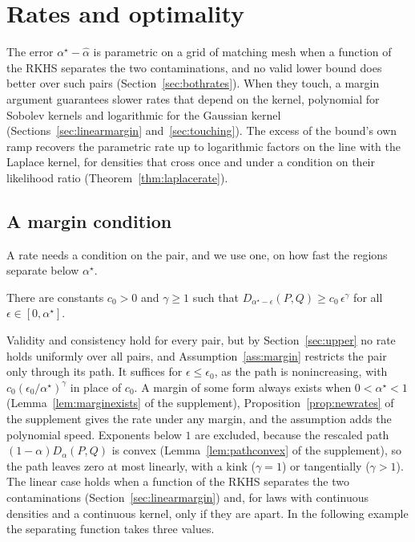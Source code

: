 \section{Rates and optimality}
\label{sec:rates}

The error $\alpha^\star-\widehat\alpha$ is parametric on a grid of matching mesh when a function of the RKHS
separates the two contaminations, and no valid lower bound does better over such pairs (Section~\ref{sec:bothrates}). When they touch, a margin argument guarantees slower rates that depend on
the kernel, polynomial for Sobolev kernels and logarithmic for the Gaussian kernel (Sections~\ref{sec:linearmargin}
and~\ref{sec:touching}). The excess of the bound's own ramp recovers the parametric rate up to logarithmic factors on
the line with the Laplace kernel, for densities that cross once and under a condition on their likelihood ratio
(Theorem~\ref{thm:laplacerate}).

\subsection{A margin condition}
\label{sec:rate}

A rate needs a condition on the pair, and we use one, on how fast the regions separate below $\alpha^\star$.

\begin{assumption}
\label{ass:margin}
There are constants $c_0>0$ and $\gamma\ge1$ such that $D_{\alpha^\star-\epsilon}(P,Q)\ge c_0\,\epsilon^\gamma$ for
all $\epsilon\in[0,\alpha^\star]$.
\end{assumption}

Validity and consistency hold for every pair, but by Section~\ref{sec:upper} no rate holds uniformly over all pairs,
and Assumption~\ref{ass:margin} restricts the pair only through its path. It suffices for $\epsilon\le\epsilon_0$, as the path is
nonincreasing, with $c_0(\epsilon_0/\alpha^\star)^\gamma$ in place of $c_0$. A margin of some form always exists when
$0<\alpha^\star<1$ (Lemma~\ref{lem:marginexists} of the supplement), Proposition~\ref{prop:newrates} of the supplement
gives the rate under any margin, and the assumption adds the polynomial speed. Exponents below $1$ are excluded, because
the rescaled path $(1-\alpha)D_\alpha(P,Q)$ is convex (Lemma~\ref{lem:pathconvex} of the supplement), so the path
leaves zero at most linearly, with a kink ($\gamma=1$) or tangentially ($\gamma>1$). The linear case holds when a function of the RKHS
separates the two contaminations (Section~\ref{sec:linearmargin}) and, for laws with continuous densities and a
continuous kernel, only if they are apart. In the following example the separating function takes three values.

